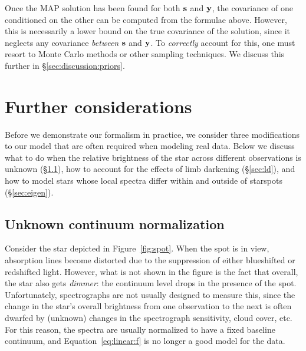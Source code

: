 \documentclass[modern]{aastex631}
\begin{document}
Once the MAP solution has been found for both ${\mathbf{s}}$ and ${\mathbf{y}}$, the covariance of one conditioned on the other can be computed from the formulae above. 
However, this is necessarily a lower bound on the true covariance of the solution, since it neglects any covariance \emph{between} ${\mathbf{s}}$ and ${\mathbf{y}}$. 
To \emph{correctly} account for this, one must resort to Monte Carlo methods or other sampling techniques. 
We discuss this further in \S\ref{sec:discussion:priors}.

\section{Further considerations}
\label{sec:bellswhistles}
%
Before we demonstrate our formalism in practice, we consider three modifications to our model that are often required when modeling real data. 
Below we discuss what to do when the relative brightness of the star across different observations is unknown (\S\ref{sec:norm}), how to account for the effects of limb darkening (\S\ref{sec:ld}), and how to model stars whose local spectra differ within and outside of starspots (\S\ref{sec:eigen}).

\subsection{Unknown continuum normalization}
\label{sec:norm}
%
Consider the star depicted in Figure~\ref{fig:spot}. 
When the spot is in view, absorption lines become distorted due to the suppression of either blueshifted or redshifted light. 
However, what is not shown in the figure is the fact that overall, the star also gets \emph{dimmer}: the continuum level drops in the presence of the spot. 
Unfortunately, spectrographs are not usually designed to measure this, since the change in the star's overall brightness from one observation to the next is often dwarfed by (unknown) changes in the spectrograph sensitivity, cloud cover, etc.
For this reason, the spectra are usually normalized to have a fixed baseline continuum, and Equation~\ref{eq:linear:f} is no longer a good model for the data.
\end{document}
